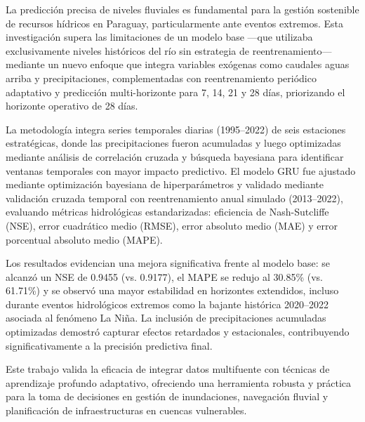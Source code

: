 \clearpage %

La predicción precisa de niveles fluviales es fundamental para la gestión sostenible de recursos hídricos en Paraguay, particularmente ante eventos extremos. Esta investigación supera las limitaciones de un modelo base —que utilizaba exclusivamente niveles históricos del río sin estrategia de reentrenamiento— mediante un nuevo enfoque que integra variables exógenas como caudales aguas arriba y precipitaciones, complementadas con reentrenamiento periódico adaptativo y predicción multi-horizonte para 7, 14, 21 y 28 días, priorizando el horizonte operativo de 28 días.

La metodología integra series temporales diarias (1995–2022) de seis estaciones estratégicas, donde las precipitaciones fueron acumuladas y luego optimizadas mediante análisis de correlación cruzada y búsqueda bayesiana para identificar ventanas temporales con mayor impacto predictivo. El modelo GRU fue ajustado mediante optimización bayesiana de hiperparámetros y validado mediante validación cruzada temporal con reentrenamiento anual simulado (2013–2022), evaluando métricas hidrológicas estandarizadas: eficiencia de Nash-Sutcliffe (NSE), error cuadrático medio (RMSE), error absoluto medio (MAE) y error porcentual absoluto medio (MAPE).

Los resultados evidencian una mejora significativa frente al modelo base: se alcanzó un NSE de 0.9455 (vs. 0.9177), el MAPE se redujo al 30.85\% (vs. 61.71\%) y se observó una mayor estabilidad en horizontes extendidos, incluso durante eventos hidrológicos extremos como la bajante histórica 2020–2022 asociada al fenómeno La Niña. La inclusión de precipitaciones acumuladas optimizadas demostró capturar efectos retardados y estacionales, contribuyendo significativamente a la precisión predictiva final.

Este trabajo valida la eficacia de integrar datos multifuente con técnicas de aprendizaje profundo adaptativo, ofreciendo una herramienta robusta y práctica para la toma de decisiones en gestión de inundaciones, navegación fluvial y planificación de infraestructuras en cuencas vulnerables.

